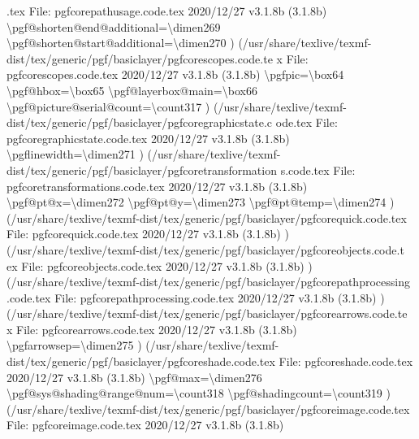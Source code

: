 \documentclass[
  letterpaper,
  DIV=11,
  numbers=noendperiod]{scrartcl}
\newenvironment{Shaded}{\begin{snugshade}}{\end{snugshade}}
\newcommand{\NormalTok}[1]{\textcolor[rgb]{0.00,0.23,0.31}{#1}}
\begin{document}
\begin{Shaded}
\begin{Highlighting}[]
\NormalTok{.tex}
\NormalTok{File: pgfcorepathusage.code.tex 2020/12/27 v3.1.8b (3.1.8b)}
\NormalTok{\textbackslash{}pgf@shorten@end@additional=\textbackslash{}dimen269}
\NormalTok{\textbackslash{}pgf@shorten@start@additional=\textbackslash{}dimen270}
\NormalTok{)}
\NormalTok{(/usr/share/texlive/texmf{-}dist/tex/generic/pgf/basiclayer/pgfcorescopes.code.te}
\NormalTok{x}
\NormalTok{File: pgfcorescopes.code.tex 2020/12/27 v3.1.8b (3.1.8b)}
\NormalTok{\textbackslash{}pgfpic=\textbackslash{}box64}
\NormalTok{\textbackslash{}pgf@hbox=\textbackslash{}box65}
\NormalTok{\textbackslash{}pgf@layerbox@main=\textbackslash{}box66}
\NormalTok{\textbackslash{}pgf@picture@serial@count=\textbackslash{}count317}
\NormalTok{)}
\NormalTok{(/usr/share/texlive/texmf{-}dist/tex/generic/pgf/basiclayer/pgfcoregraphicstate.c}
\NormalTok{ode.tex}
\NormalTok{File: pgfcoregraphicstate.code.tex 2020/12/27 v3.1.8b (3.1.8b)}
\NormalTok{\textbackslash{}pgflinewidth=\textbackslash{}dimen271}
\NormalTok{)}
\NormalTok{(/usr/share/texlive/texmf{-}dist/tex/generic/pgf/basiclayer/pgfcoretransformation}
\NormalTok{s.code.tex}
\NormalTok{File: pgfcoretransformations.code.tex 2020/12/27 v3.1.8b (3.1.8b)}
\NormalTok{\textbackslash{}pgf@pt@x=\textbackslash{}dimen272}
\NormalTok{\textbackslash{}pgf@pt@y=\textbackslash{}dimen273}
\NormalTok{\textbackslash{}pgf@pt@temp=\textbackslash{}dimen274}
\NormalTok{)}
\NormalTok{(/usr/share/texlive/texmf{-}dist/tex/generic/pgf/basiclayer/pgfcorequick.code.tex}
\NormalTok{File: pgfcorequick.code.tex 2020/12/27 v3.1.8b (3.1.8b)}
\NormalTok{)}
\NormalTok{(/usr/share/texlive/texmf{-}dist/tex/generic/pgf/basiclayer/pgfcoreobjects.code.t}
\NormalTok{ex}
\NormalTok{File: pgfcoreobjects.code.tex 2020/12/27 v3.1.8b (3.1.8b)}
\NormalTok{)}
\NormalTok{(/usr/share/texlive/texmf{-}dist/tex/generic/pgf/basiclayer/pgfcorepathprocessing}
\NormalTok{.code.tex}
\NormalTok{File: pgfcorepathprocessing.code.tex 2020/12/27 v3.1.8b (3.1.8b)}
\NormalTok{)}
\NormalTok{(/usr/share/texlive/texmf{-}dist/tex/generic/pgf/basiclayer/pgfcorearrows.code.te}
\NormalTok{x}
\NormalTok{File: pgfcorearrows.code.tex 2020/12/27 v3.1.8b (3.1.8b)}
\NormalTok{\textbackslash{}pgfarrowsep=\textbackslash{}dimen275}
\NormalTok{)}
\NormalTok{(/usr/share/texlive/texmf{-}dist/tex/generic/pgf/basiclayer/pgfcoreshade.code.tex}
\NormalTok{File: pgfcoreshade.code.tex 2020/12/27 v3.1.8b (3.1.8b)}
\NormalTok{\textbackslash{}pgf@max=\textbackslash{}dimen276}
\NormalTok{\textbackslash{}pgf@sys@shading@range@num=\textbackslash{}count318}
\NormalTok{\textbackslash{}pgf@shadingcount=\textbackslash{}count319}
\NormalTok{)}
\NormalTok{(/usr/share/texlive/texmf{-}dist/tex/generic/pgf/basiclayer/pgfcoreimage.code.tex}
\NormalTok{File: pgfcoreimage.code.tex 2020/12/27 v3.1.8b (3.1.8b)}


\end{Highlighting}
\end{Shaded}
\end{document}
